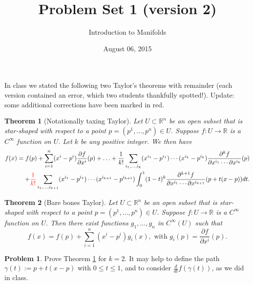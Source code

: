 \documentclass{amsart}
\newcommand{\+}[1]{\ensuremath{\mathbf{#1}}}
\newcommand{\R}{{\mathbb R}}
\newtheorem{thm}{Theorem}
\theoremstyle{definition}
\newtheorem{prob}{Problem}
\begin{document}
\title{Problem Set 1 (version 2)}
\date{August 06, 2015}
\author{Introduction to Manifolds}

\maketitle

In class we stated the following two Taylor's theorems with remainder (each version contained an error,
which two students thankfully spotted!).  {\color{red} Update: some additional corrections have been marked in red.}

\begin{framed}
\begin{thm}[Notationally taxing Taylor]\label{T:complicated_taylor}
Let $U \subset \R^n$ be an open subset that is star-shaped with respect to a point $p = (p^1,\ldots,p^n) \in U$.
Suppose $f:U \to \R$ is a $C^\infty$ function on $U$.  Let $k$ be any positive integer.  We then have
\begin{align*}
f(x) = f(p) + \sum^n_{i=1} (x^i - p^i) \frac{\partial f}{\partial x^i} (p) + \ldots
+ \frac{1}{k!} \sum_{i_1,\ldots,i_k} (x^{i_1} - p^{i_1})\cdots(x^{i_k} - p^{i_k}) 
\frac{\partial^k f}{\partial x^{i_1} \cdots \partial x^{i_k}}(p) \\
+ {\color{red}\frac{1}{k!}}\sum_{i_1,\ldots,i_{k+1}}(x^{i_1} - p^{i_1})\cdots(x^{i_{k+1}} - p^{i_{k+1}})\int^1_0 (1-t)^k 
\frac{\partial^{k+1} f}{\partial x^{i_1} \cdots \partial x^{i_{k+1}}}(p + t(x-p)) dt.
\end{align*}
\end{thm}
\end{framed}


\begin{framed}
\begin{thm}[Bare bones Taylor]\label{T:simple_taylor}
Let $U \subset \R^n$ be an open subset that is star-shaped with respect to a point $p = (p^1,\ldots,p^n) \in U$.
Suppose $f:U \to \R$ is a $C^\infty$ function on $U$.  Then there exist functions
$g_1, \ldots, g_n$ in $C^\infty(U)$ such that 
\[
f(x) = f(p) + \sum^n_{i=1} (x^i - p^i)g_i(x), \text{ with } g_i(p) = \frac{\partial f}{\partial x^i} (p).
\]
\end{thm}
\end{framed}

\begin{prob}
Prove Theorem \ref{T:complicated_taylor} for $k = 2$.  It may help to define the
 path $\gamma(t) := p + t(x-p)$ with $0 \leq t \leq 1$, and to consider
 $\frac{d}{dt} f(\gamma(t))$, as we did in class.
\end{prob} 
\end{document}

